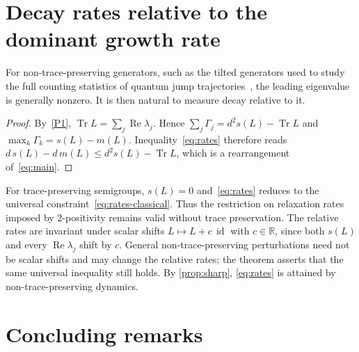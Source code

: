 \documentclass[11pt,a4paper]{article}
\theoremstyle{plain}
\newtheorem{corollary}[theorem]{Corollary}
\theoremstyle{definition}
\theoremstyle{remark}
\numberwithin{equation}{section}
\newcommand{\R}{\mathbb{R}}
\newcommand{\Tr}{\operatorname{Tr}}
\newcommand{\Rea}{\operatorname{Re}}
\newcommand{\id}{\operatorname{id}}
\newcommand{\mmin}{m}
\newcommand{\smax}{s}
\begin{document}
\section{Decay rates relative to the dominant growth rate}\label{sec:rates}

For non-trace-preserving generators, such as the tilted generators used to study
the full counting statistics of quantum jump trajectories~\cite{CGLP18}, the
leading eigenvalue is generally nonzero. It is then natural to measure decay
relative to it.


\begin{proof}
By~\ref{P1}, $\Tr L=\sum_j\Rea\lambda_j$. Hence
$\sum_j\Gamma_j=d^2\smax(L)-\Tr L$ and $\max_k\Gamma_k=\smax(L)-\mmin(L)$.
Inequality~\eqref{eq:rates} therefore reads
$d\,\smax(L)-d\,\mmin(L)\le d^2\smax(L)-\Tr L$, which is a rearrangement
of~\eqref{eq:main}.
\end{proof}

For trace-preserving semigroups, $\smax(L)=0$ and~\eqref{eq:rates} reduces to the
universal constraint~\eqref{eq:rates-classical}. Thus the restriction on relaxation
rates imposed by 2-positivity remains valid without trace preservation.
The relative rates are invariant under scalar shifts $L\mapsto L+c\,\id$
with $c\in\R$, since both $\smax(L)$ and every $\Rea\lambda_j$ shift by $c$.
General non-trace-preserving perturbations need not be scalar shifts and may
change the relative rates; the theorem asserts that the same universal
inequality still holds.
By \cref{prop:sharp}, \eqref{eq:rates} is attained by non-trace-preserving
dynamics.

\section{Concluding remarks}\label{sec:conclusion}
\end{document}
